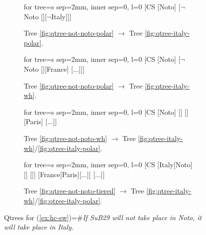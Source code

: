 \begin{figure}[H]
\centering
\begin{subfigure}[b]{.22\linewidth}
	\centering
	\scalebox{.8}
	{\begin{forest}for tree={s sep=2mm, inner sep=0, l=0}
			[CS [{Noto}] [{$\neg$Noto} [][$\neg$Italy]]]
	\end{forest}}
	\caption{Tree \ref{fig:qtree-not-noto-polar} $\rightarrow$ Tree \ref{fig:qtree-italy-polar}.}\label{fig:tree-hc-sw-polar-polar}
\end{subfigure}\hfill
\begin{subfigure}[b]{.24\linewidth}
	\centering
	\scalebox{.8}
	{\begin{forest}for tree={s sep=2mm, inner sep=0, l=0}
			[CS [{Noto}] [{$\neg$Noto} [][France] [...]]]
	\end{forest}}
	\caption{Tree \ref{fig:qtree-not-noto-polar} $\rightarrow$ Tree \ref{fig:qtree-italy-wh}.}\label{fig:tree-hc-sw-polar-wh}
\end{subfigure}\hfill
\begin{subfigure}[b]{.25\linewidth}
	\centering
	\scalebox{.8}
	{\begin{forest}for tree={s sep=2mm, inner sep=0, l=0}
			[CS [{Noto}] [] [] [{Paris}] [...]]
	\end{forest}}
	\caption{Tree \ref{fig:qtree-not-noto-wh} $\rightarrow$ Tree \ref{fig:qtree-italy-wh}/\ref{fig:qtree-italy-polar}.}\label{fig:qtree-if-not-noto-italy-wh-wh}\label{fig:tree-hc-sw-wh}
\end{subfigure}\hfill
\begin{subfigure}[b]{.25\linewidth}
	\centering
	\scalebox{.8}
	{\begin{forest}for tree={s sep=2mm, inner sep=0, l=0}
			[CS [Italy[{Noto}] [] []]  [France[{Paris}][...]] [...]]
	\end{forest}}
	\caption{Tree \ref{fig:qtree-not-noto-tiered} $\rightarrow$ Tree \ref{fig:qtree-italy-wh}/\ref{fig:qtree-italy-polar}.}\label{fig:qtree-if-not-noto-italy-tiered-wh}\label{fig:tree-hc-sw-wh-wh}
\end{subfigure}
\caption{Qtrees for (\ref{ex:hc-sw})=\#\textit{If SuB29 will not take place in Noto, it will take place in Italy.}}
\label{fig:qtrees-if-not-noto-italy}
\end{figure}

